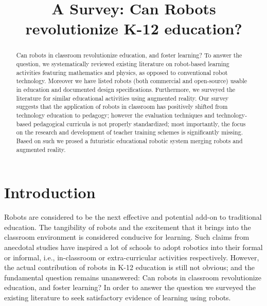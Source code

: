 \documentclass[conference]{IEEEtran}
\begin{document}
\title{A Survey: Can Robots revolutionize K-12 education?}
\author{
}
  
\maketitle

\begin{abstract}
Can robots in classroom revolutionize education, and foster learning? To answer the question, we systematically 
reviewed existing literature on robot-based learning activities featuring mathematics and physics, as opposed to 
conventional robot technology. Moreover we have listed robots (both commercial and open-source) usable in education 
and documented design specifications. Furthermore, we surveyed the literature for similar educational activities 
using augmented reality. Our survey suggests that the application of robots in classroom has positively shifted from 
technology education to pedagogy; however the evaluation techniques and technology-based pedagogical curricula is 
not properly standardized; most importantly, the focus on the research and development of teacher training schemes is 
significantly missing. Based on such we prosed a futuristic educational robotic system merging robots and augmented 
reality. 
\end{abstract}

\IEEEpeerreviewmaketitle
\section{Introduction}
Robots are considered to be the next effective and potential add-on to traditional education. The tangibility of robots 
and the excitement that it brings into the classroom environment is considered conducive for learning. Such claims from 
anecdotal studies have inspired a lot of schools to adopt robotics into their formal or informal, i.e., in-classroom or 
extra-curricular activities respectively. However, the actual contribution of robots in K-12 education is still not 
obvious; and the fundamental question remains unanswered: Can robots in classroom revolutionize education, and foster 
learning? In order to answer the question we surveyed the existing literature to seek satisfactory evidence of learning 
using robots. 
\end{document}
